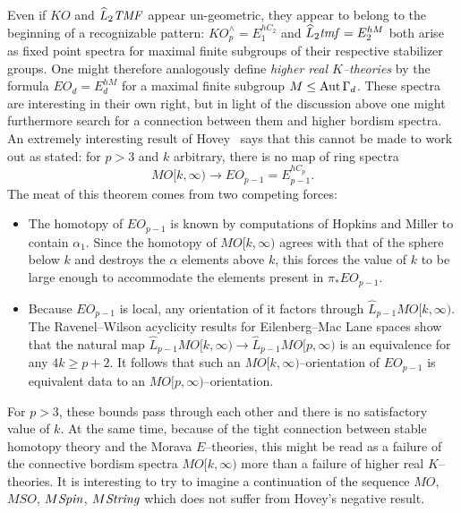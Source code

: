 Even if \(KO\) and \(\widehat L_2 \mathit{TMF}\) appear un-geometric, they appear to belong to the beginning of a recognizable pattern: \(KO^\wedge_p = E_1^{hC_2}\) and \(\widehat L_2 \mathit{tmf} = E_2^{hM}\) both arise as fixed point spectra for maximal finite subgroups of their respective stabilizer groups.
One might therefore analogously define \textit{higher real \(K\)--theories} by the formula \(EO_d = E_d^{hM}\) for a maximal finite subgroup \(M \le \operatorname{Aut} \Gamma_d\).
These spectra are interesting in their own right, but in light of the discussion above one might furthermore search for a connection between them and higher bordism spectra.
An extremely interesting result of Hovey~\cite[Proposition 2.3.4]{HoveyVnEltsOfRings} says that this cannot be made to work out as stated: for \(p > 3\) and \(k\) arbitrary, there is no map of ring spectra \[MO[k, \infty) \to EO_{p-1} = E_{p-1}^{hC_p}.\]
The meat of this theorem comes from two competing forces:
\begin{itemize}
    \item The homotopy of \(EO_{p-1}\) is known by computations of Hopkins and Miller to contain \(\alpha_1\).
          Since the homotopy of \(MO[k, \infty)\) agrees with that of the sphere below \(k\) and destroys the \(\alpha\) elements above \(k\), this forces the value of \(k\) to be large enough to accommodate the elements present in \(\pi_* EO_{p-1}\).
    \item Because \(EO_{p-1}\) is local, any orientation of it factors through \(\widehat L_{p-1} MO[k, \infty)\).
          The Ravenel--Wilson acyclicity results for Eilenberg--Mac Lane spaces show that the natural map \(\widehat L_{p-1} MO[k, \infty) \to \widehat L_{p-1} MO[p, \infty)\) is an equivalence for any \(4k \ge p+2\).
          It follows that such an \(MO[k, \infty)\)--orientation of \(EO_{p-1}\) is equivalent data to an \(MO[p, \infty)\)--orientation.
\end{itemize}
For \(p > 3\), these bounds pass through each other and there is no satisfactory value of \(k\).
At the same time, because of the tight connection between stable homotopy theory and the Morava \(E\)--theories, this might be read as a failure of the connective bordism spectra \(MO[k, \infty)\) more than a failure of higher real \(K\)--theories.
It is interesting to try to imagine a continuation of the sequence \(MO\), \(MSO\), \(M\mathit{Spin}\), \(M\mathit{String}\) which does not suffer from Hovey's negative result.

